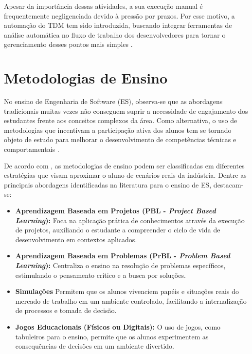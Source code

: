 \documentclass[12pt,openright,oneside,a4paper,brazil]{abntex2}
\begin{document}
Apesar da importância dessas atividades, a sua execução manual é frequentemente negligenciada devido à pressão por prazos. Por esse motivo, a automação do TDM tem sido introduzida, buscando integrar ferramentas de análise automática no fluxo de trabalho dos desenvolvedores para tornar o gerenciamento desses pontos mais simples \cite{RIOS2018117,BIAZOTTO2024107375,Ruiz2024}.

\section{Metodologias de Ensino}

No ensino de Engenharia de Software (ES), observa-se que as abordagens tradicionais muitas vezes não conseguem suprir a necessidade de engajamento dos estudantes frente aos conceitos complexos da área. Como alternativa, o uso de metodologias que incentivam a participação ativa dos alunos tem se tornado objeto de estudo para melhorar o desenvolvimento de competências técnicas e comportamentais \cite{Borges2024,KREBS}.

De acordo com \cite{Borges2024}, as metodologias de ensino podem ser classificadas em diferentes estratégias que visam aproximar o aluno de cenários reais da indústria. Dentre as principais abordagens identificadas na literatura para o ensino de ES, destacam-se:

\begin{itemize}
    \item \textbf{Aprendizagem Baseada em Projetos (PBL - \textit{Project Based Learning}):} Foca na aplicação prática de conhecimentos através da execução de projetos, auxiliando o estudante a compreender o ciclo de vida de desenvolvimento em contextos aplicados.
    \item \textbf{Aprendizagem Baseada em Problemas (PrBL - \textit{Problem Based Learning}):} Centraliza o ensino na resolução de problemas específicos, estimulando o pensamento crítico e a busca por soluções.
    \item \textbf{Simulações} Permitem que os alunos vivenciem papéis e situações reais do mercado de trabalho em um ambiente controlado, facilitando a internalização de processos e tomada de decisão.
    \item \textbf{Jogos Educacionais (Físicos ou Digitais):} O uso de jogos, como tabuleiros para o ensino, permite que os alunos experimentem as consequências de decisões em um ambiente divertido.
\end{itemize}
\end{document}
